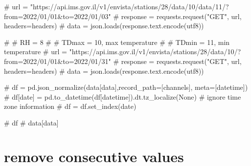 \documentclass[
  letterpaper,
  DIV=11,
  numbers=noendperiod,
  oneside]{scrreprt}
\newenvironment{Shaded}{\begin{snugshade}}{\end{snugshade}}
\newcommand{\CommentTok}[1]{\textcolor[rgb]{0.37,0.37,0.37}{#1}}
\begin{document}
\begin{Shaded}
\begin{Highlighting}[]
\CommentTok{\# url = "https://api.ims.gov.il/v1/envista/stations/28/data/10/data/11/?from=2022/01/01\&to=2022/01/03"}
\CommentTok{\# response = requests.request("GET", url, headers=headers)}
\CommentTok{\# data = json.loads(response.text.encode(\textquotesingle{}utf8\textquotesingle{}))}
\end{Highlighting}
\end{Shaded}

\begin{Shaded}
\begin{Highlighting}[]
\CommentTok{\# \# RH = 8}
\CommentTok{\# \# TDmax = 10, max temperature}
\CommentTok{\# \# TDmin = 11, min temperature}
\CommentTok{\# url = "https://api.ims.gov.il/v1/envista/stations/28/data/10/?from=2022/01/01\&to=2022/01/31"}
\CommentTok{\# response = requests.request("GET", url, headers=headers)}
\CommentTok{\# data = json.loads(response.text.encode(\textquotesingle{}utf8\textquotesingle{}))}

\CommentTok{\# df = pd.json\_normalize(data[\textquotesingle{}data\textquotesingle{}],record\_path=[\textquotesingle{}channels\textquotesingle{}], meta=[\textquotesingle{}datetime\textquotesingle{}])}
\CommentTok{\# df[\textquotesingle{}date\textquotesingle{}] = pd.to\_datetime(df[\textquotesingle{}datetime\textquotesingle{}]).dt.tz\_localize(None)  \# ignore time zone information}
\CommentTok{\# df = df.set\_index(\textquotesingle{}date\textquotesingle{})}

\CommentTok{\# df}
\CommentTok{\# data[\textquotesingle{}data\textquotesingle{}]}
\end{Highlighting}
\end{Shaded}

\hypertarget{remove-consecutive-values}{%
\chapter*{remove consecutive values}\label{remove-consecutive-values}}

\end{document}
